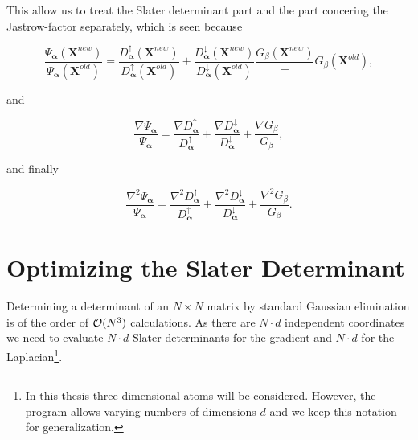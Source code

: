 This allow us to treat the Slater determinant part and the part
concering the Jastrow-factor separately, which is seen because

\begin{equation}
  \frac{\Psi_{\mathbf{\alpha}}(\mathbf{X}^{new})}
       {\Psi_{\mathbf{\alpha}}(\mathbf{X}^{old})} =
  \frac{D_{\mathbf{\alpha}}^{\uparrow}(\mathbf{X}^{new})}
       {D_{\mathbf{\alpha}}^{\uparrow}(\mathbf{X}^{old})} +
  \frac{D_{\mathbf{\alpha}}^{\downarrow}(\mathbf{X}^{new})}
       {D_{\mathbf{\alpha}}^{\downarrow}(\mathbf{X}^{old})}
  \frac{G_{\beta}(\mathbf{X}^{new})} +
       {G_{\beta}(\mathbf{X}^{old})},    
\label{trialWaveFunctionRatio}
\end{equation}

and

\begin{equation}
  \frac{ \nabla \Psi_{\mathbf{\alpha}} }{ \Psi_{\mathbf{\alpha}} } 
  = \frac{ \nabla D_{\mathbf{\alpha}}^{\uparrow}   }
  { D_{\mathbf{\alpha}}^{\uparrow} }
  + \frac{ \nabla D_{\mathbf{\alpha}}^{\downarrow} }
  { D_{\mathbf{\alpha}}^{\downarrow} }
  + \frac{ \nabla G_{\beta}                        }
  { G_{\beta} },
\label{trialWaveFunctionGradient}
\end{equation}

and finally

\begin{equation}
  \frac{ \nabla^2 \Psi_{\mathbf{\alpha}} }{ \Psi_{\mathbf{\alpha}} } 
  = \frac{ \nabla^2 D_{\mathbf{\alpha}}^{\uparrow}   }
  { D_{\mathbf{\alpha}}^{\uparrow} }
  + \frac{ \nabla^2 D_{\mathbf{\alpha}}^{\downarrow} }
  { D_{\mathbf{\alpha}}^{\downarrow} }
  + \frac{ \nabla^2 G_{\beta}                        }
  { G_{\beta} }.
\label{trialWaveFunctionLaplacian}
\end{equation}


\section{Optimizing the Slater Determinant}
\label{OptimizingTheSlaterDeterminant}

Determining a determinant of an $N \times N$ matrix by
standard Gaussian elimination is of the order of ${\cal O}(N^3)$
calculations. As there are $N\cdot d$ independent coordinates we need
to evaluate $N\cdot d$ Slater determinants for the gradient and
$N\cdot d$ for the Laplacian\footnote{In this thesis three-dimensional
  atoms will be considered. However, the program allows varying numbers
  of dimensions $d$ and we keep this notation for generalization.}.

